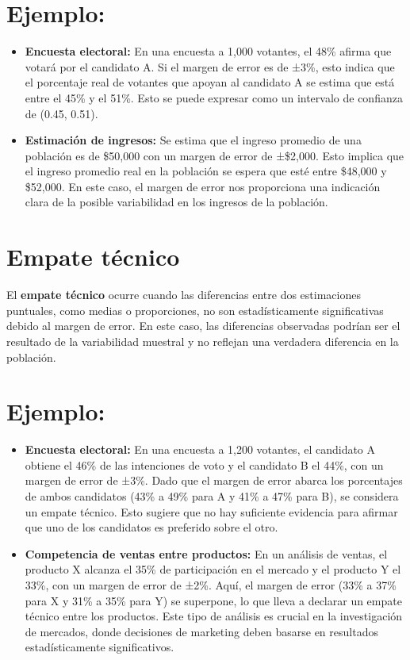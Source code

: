 \documentclass[
  letterpaper,
  DIV=11,
  numbers=noendperiod]{scrreprt}
\begin{document}
\section{Ejemplo:}\label{ejemplo}

\begin{itemize}
\item
  \textbf{Encuesta electoral:} En una encuesta a 1,000 votantes, el 48\%
  afirma que votará por el candidato A. Si el margen de error es de
  ±3\%, esto indica que el porcentaje real de votantes que apoyan al
  candidato A se estima que está entre el 45\% y el 51\%. Esto se puede
  expresar como un intervalo de confianza de (0.45, 0.51).
\item
  \textbf{Estimación de ingresos:} Se estima que el ingreso promedio de
  una población es de \$50,000 con un margen de error de ±\$2,000. Esto
  implica que el ingreso promedio real en la población se espera que
  esté entre \$48,000 y \$52,000. En este caso, el margen de error nos
  proporciona una indicación clara de la posible variabilidad en los
  ingresos de la población.
\end{itemize}

\section{Empate técnico}\label{empate-tuxe9cnico}

El \textbf{empate técnico} ocurre cuando las diferencias entre dos
estimaciones puntuales, como medias o proporciones, no son
estadísticamente significativas debido al margen de error. En este caso,
las diferencias observadas podrían ser el resultado de la variabilidad
muestral y no reflejan una verdadera diferencia en la población.

\section{Ejemplo:}\label{ejemplo-1}

\begin{itemize}
\item
  \textbf{Encuesta electoral:} En una encuesta a 1,200 votantes, el
  candidato A obtiene el 46\% de las intenciones de voto y el candidato
  B el 44\%, con un margen de error de ±3\%. Dado que el margen de error
  abarca los porcentajes de ambos candidatos (43\% a 49\% para A y 41\%
  a 47\% para B), se considera un empate técnico. Esto sugiere que no
  hay suficiente evidencia para afirmar que uno de los candidatos es
  preferido sobre el otro.
\item
  \textbf{Competencia de ventas entre productos:} En un análisis de
  ventas, el producto X alcanza el 35\% de participación en el mercado y
  el producto Y el 33\%, con un margen de error de ±2\%. Aquí, el margen
  de error (33\% a 37\% para X y 31\% a 35\% para Y) se superpone, lo
  que lleva a declarar un empate técnico entre los productos. Este tipo
  de análisis es crucial en la investigación de mercados, donde
  decisiones de marketing deben basarse en resultados estadísticamente
  significativos.
\end{itemize}
\end{document}
